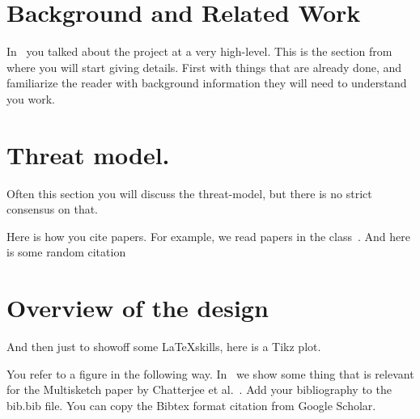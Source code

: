 \section{Background and Related Work}
\label{sec:relwork}
In~ you talked about the project at a very high-level. This is
the section from where you will start giving details. First with things that are
already done, and familiarize the reader with background information they will
need to understand you work. 


\section{Threat model.}
Often this section you will discuss the threat-model, but there is no strict consensus on that. 


Here is how you cite papers. For example, we read papers in the
class~\cite{rahul2016pwtypos,dodisetal:2004}.  And here is some random citation~\cite{Bojinov:2010:KLP,schechter:2010:pen,everspaugh2015pythia,bellare2009format,Juels:2014}


\section{Overview of the design}
\label{sec:overview}

And then just to showoff some \LaTeX skills, here is a Tikz plot.


You refer to a figure in the following way. In~ we show
some thing that is relevant for the Multisketch paper by Chatterjee et
al.~\cite{chatterjee2019multisketches}. Add your bibliography to the
\textsf{bib.bib} file. You can copy the Bibtex format citation from Google
Scholar.
